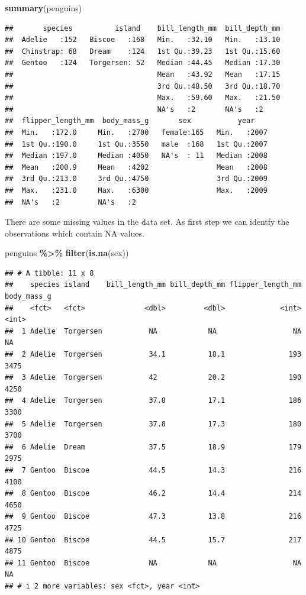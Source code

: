 \documentclass[
]{article}
\newenvironment{Shaded}{\begin{snugshade}}{\end{snugshade}}
\newcommand{\FunctionTok}[1]{\textcolor[rgb]{0.13,0.29,0.53}{\textbf{#1}}}
\newcommand{\NormalTok}[1]{#1}
\newcommand{\SpecialCharTok}[1]{\textcolor[rgb]{0.81,0.36,0.00}{\textbf{#1}}}
\begin{document}
\begin{Shaded}
\begin{Highlighting}[]
\FunctionTok{summary}\NormalTok{(penguins)}
\end{Highlighting}
\end{Shaded}

\begin{verbatim}
##       species          island    bill_length_mm  bill_depth_mm  
##  Adelie   :152   Biscoe   :168   Min.   :32.10   Min.   :13.10  
##  Chinstrap: 68   Dream    :124   1st Qu.:39.23   1st Qu.:15.60  
##  Gentoo   :124   Torgersen: 52   Median :44.45   Median :17.30  
##                                  Mean   :43.92   Mean   :17.15  
##                                  3rd Qu.:48.50   3rd Qu.:18.70  
##                                  Max.   :59.60   Max.   :21.50  
##                                  NA's   :2       NA's   :2      
##  flipper_length_mm  body_mass_g       sex           year     
##  Min.   :172.0     Min.   :2700   female:165   Min.   :2007  
##  1st Qu.:190.0     1st Qu.:3550   male  :168   1st Qu.:2007  
##  Median :197.0     Median :4050   NA's  : 11   Median :2008  
##  Mean   :200.9     Mean   :4202                Mean   :2008  
##  3rd Qu.:213.0     3rd Qu.:4750                3rd Qu.:2009  
##  Max.   :231.0     Max.   :6300                Max.   :2009  
##  NA's   :2         NA's   :2
\end{verbatim}

There are some missing values in the data set. As first step we can
identfy the observations which contain NA values.

\begin{Shaded}
\begin{Highlighting}[]
\NormalTok{penguins }\SpecialCharTok{\%\textgreater{}\%} \FunctionTok{filter}\NormalTok{(}\FunctionTok{is.na}\NormalTok{(sex))}
\end{Highlighting}
\end{Shaded}

\begin{verbatim}
## # A tibble: 11 x 8
##    species island    bill_length_mm bill_depth_mm flipper_length_mm body_mass_g
##    <fct>   <fct>              <dbl>         <dbl>             <int>       <int>
##  1 Adelie  Torgersen           NA            NA                  NA          NA
##  2 Adelie  Torgersen           34.1          18.1               193        3475
##  3 Adelie  Torgersen           42            20.2               190        4250
##  4 Adelie  Torgersen           37.8          17.1               186        3300
##  5 Adelie  Torgersen           37.8          17.3               180        3700
##  6 Adelie  Dream               37.5          18.9               179        2975
##  7 Gentoo  Biscoe              44.5          14.3               216        4100
##  8 Gentoo  Biscoe              46.2          14.4               214        4650
##  9 Gentoo  Biscoe              47.3          13.8               216        4725
## 10 Gentoo  Biscoe              44.5          15.7               217        4875
## 11 Gentoo  Biscoe              NA            NA                  NA          NA
## # i 2 more variables: sex <fct>, year <int>
\end{verbatim}
\end{document}
